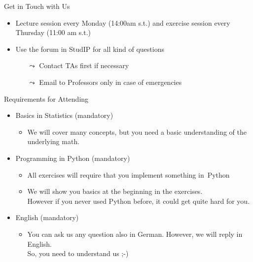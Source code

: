 \documentclass[aspectratio=169]{../latex_main/tntbeamer}  %
\begin{document}
\begin{frame}[c]{Get in Touch with Us}

\begin{itemize}
  \item Lecture session every Monday (14:00am s.t.) and exercise session every Thursday (11:00 am s.t.)
  \item \alert{Use the forum in StudIP for all kind of questions}
  \begin{itemize}
        \item[$\leadsto$] Contact TAs first if necessary 
      \item[$\leadsto$] Email to Professors only in case of emergencies
  \end{itemize}
\end{itemize}

\end{frame}
\begin{frame}[c]{Requirements for Attending}

\begin{itemize}
    \item Basics in \alert{Statistics} (mandatory)
    \begin{itemize}
        \item We will cover many concepts, but you need a basic understanding of the underlying math.
    \end{itemize}
  \item Programming in \alert{Python} (mandatory)
  \begin{itemize}
    \item All exercises will require that you implement something in~Python 
    \item We will show you basics at the beginning in the exercises.\\ However if you never used Python before, it could get quite hard for you.
  \end{itemize}
  \item \alert{English} (mandatory)
    \begin{itemize}
    \item You can ask us any question also in German. However, we will reply in English.\\ So, you need to understand us ;-)
  \end{itemize}
\end{itemize}

\end{frame}
\end{document}
